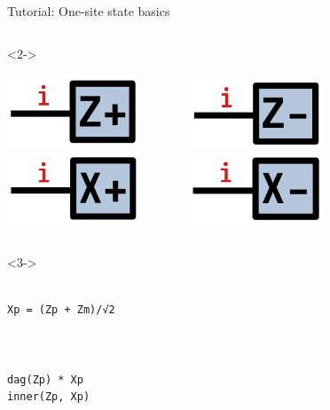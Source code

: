 \begin{frame}[fragile]{Tutorial: One-site state basics}
\begin{columns}
\begin{column}[T]{0.6\textwidth}
\begin{onlyenv}<2->
\vspace*{-0.4cm}
\begin{center}
\includegraphics[width=0.3\textwidth]{
  slides/assets/Zp.png
} \ \ \ \ \ \ \ 
\includegraphics[width=0.3\textwidth]{
  slides/assets/Zm.png
} \\
\includegraphics[width=0.3\textwidth]{
  slides/assets/Xp.png
} \ \ \ \ \ \ \ 
\includegraphics[width=0.3\textwidth]{
  slides/assets/Xm.png
}
\end{center}
\end{onlyenv}
\end{column}

\end{columns}

\begin{columns}

\begin{column}[T]{0.45\textwidth}
\begin{onlyenv}<3->
~\\
~\\
\begin{lstlisting}[language=JuliaLocal, style=julia, basicstyle=\scriptsize\ttfamily]
Xp = (Zp + Zm)/√2



dag(Zp) * Xp
inner(Zp, Xp)
\end{lstlisting}
\end{onlyenv}
\end{column}


\end{columns}
\end{frame}
